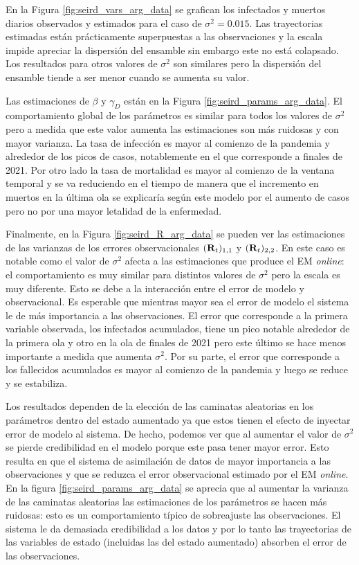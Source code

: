 En la Figura \ref{fig:seird_vars_arg_data} se grafican los infectados y muertos diarios observados y estimados para el caso de $\sigma^2 = 0.015$. Las trayectorias estimadas están prácticamente superpuestas a las observaciones y la escala impide apreciar la dispersión del ensamble sin embargo este no está colapsado. Los resultados para otros valores de $\sigma^2$ son similares pero la dispersión del ensamble tiende a ser menor cuando se aumenta su valor.

Las estimaciones de $\beta$ y $\gamma_D$ están en la Figura \ref{fig:seird_params_arg_data}. El comportamiento global de los parámetros es similar para todos los valores de $\sigma^2$ pero a medida que este valor aumenta las estimaciones son más ruidosas y con mayor varianza.
La tasa de infección es mayor al comienzo de la pandemia y alrededor de los picos de casos, notablemente en el que corresponde a finales de 2021. Por otro lado la tasa de mortalidad es mayor al comienzo de la ventana temporal y se va reduciendo en el tiempo de manera que el incremento en muertos en la última ola se explicaría según este modelo por el aumento de casos pero no por una mayor letalidad de la enfermedad.

Finalmente, en la Figura \ref{fig:seird_R_arg_data} se pueden ver las estimaciones de las varianzas de los errores observacionales $(\mathbf{R}_t)_{1,1}$ y $(\mathbf{R}_t)_{2, 2}$. En este caso es notable como el valor de $\sigma^2$ afecta a las estimaciones que produce el EM \textit{online}: el comportamiento es muy similar para distintos valores de $\sigma^2$ pero la escala es muy diferente. Esto se debe a la interacción entre el error de modelo y observacional. Es esperable que mientras mayor sea el error de modelo el sistema le de más importancia a las observaciones. El error que corresponde a la primera variable observada, los infectados acumulados, tiene un pico notable alrededor de la primera ola y otro en la ola de finales de 2021 pero este último se hace menos importante a medida que aumenta $\sigma^2$. Por su parte, el error que corresponde a los fallecidos acumulados es mayor al comienzo de la pandemia y luego se reduce y se estabiliza.

Los resultados dependen de la elección de las caminatas aleatorias en los parámetros dentro del estado aumentado ya que estos tienen el efecto de inyectar error de modelo al sistema. De hecho, podemos ver que al aumentar el valor de $\sigma^2$ se pierde credibilidad en el modelo porque este pasa tener mayor error. Esto resulta en que el sistema de asimilación de datos de mayor importancia a las observaciones y que se reduzca el error observacional estimado por el EM \textit{online}. En la figura \ref{fig:seird_params_arg_data} se aprecia que al aumentar la varianza de las caminatas aleatorias las estimaciones de los parámetros se hacen más ruidosas: esto es un comportamiento típico de sobreajuste las observaciones. El sistema le da demasiada credibilidad a los datos y por lo tanto las trayectorias de las variables de estado (incluidas las del estado aumentado) absorben el error de las observaciones.

